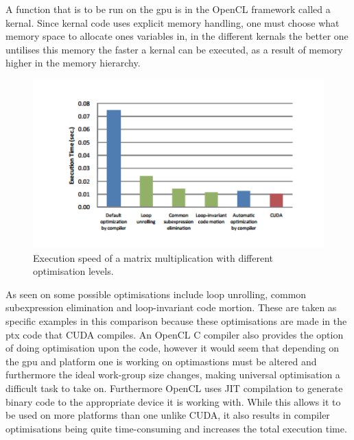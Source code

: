 
A function that is to be run on the \acrshort{gpu} is in the OpenCL framework called a kernal.
Since kernal code uses explicit memory handling, one must choose what memory space to allocate ones variables in, in the different kernals the better one untilises this memory the faster a kernal can be executed, as a result of memory higher in the memory hierarchy.
\begin{figure}[h!]
\centering
 \includegraphics[width=1\textwidth]{figures/OpenCLOptimisation.png} %
\caption{Execution speed of a matrix multiplication with different optimisation levels. \citep{CUDAOpenCLOptimisation}}\label{image:OpenCLOptCompare}
\vspace{-15pt}
\end{figure}
As seen on  some possible optimisations include loop unrolling, common subexpression elimination and loop-invariant code mortion. These are taken as specific examples in this comparison because these optimisations are made in the \acrlong{ptx} code that CUDA compiles.
An OpenCL C compiler also provides the option of doing optimisation upon the code, however it would seem that depending on the \acrshort{gpu} and platform one is working on optimastions must be altered and furthermore the ideal work-group size changes, making universal optimisation a difficult task to take on.
Furthermore OpenCL uses JIT compilation to generate binary code to the appropriate device it is working with.
While this allows it to be used on more platforms than one unlike CUDA, it also results in compiler optimisations being quite time-consuming and increases the total execution time.\citep{CUDAOpenCLOptimisation}